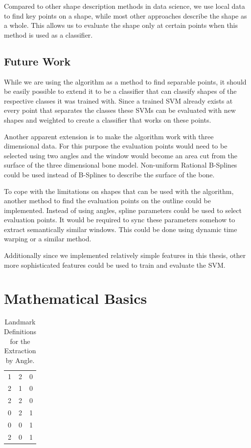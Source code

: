 \documentclass[pdftex,12pt,a4paper]{report}
\begin{document}
Compared to other shape description methods in data science, we use local data to find key points on a shape, while most other approaches describe the shape as a whole. This allows us to evaluate the shape only at certain points when this method is used as a classifier.

\section{Future Work}

While we are using the algorithm as a method to find separable points, it should be easily possible to extend it to be a classifier that can classify shapes of the respective classes it was trained with. Since a trained SVM already exists at every point that separates the classes these SVMs can be evaluated with new shapes and weighted to create a classifier that works on these points.

Another apparent extension is to make the algorithm work with three dimensional data. For this purpose the evaluation points would need to be selected using two angles and the window would become an area cut from the surface of the three dimensional bone model. Non-uniform Rational B-Splines could be used instead of B-Splines to describe the surface of the bone.

To cope with the limitations on shapes that can be used with the algorithm, another method to find the evaluation points on the outline could be implemented. Instead of using angles, spline parameters could be used to select evaluation points. It would be required to sync these parameters somehow to extract semantically similar windows. This could be done using dynamic time warping or a similar method.

Additionally since we implemented relatively simple features in this thesis, other more sophisticated features could be used to train and evaluate the SVM.

\appendix

\chapter{Mathematical Basics}

\begin{table}[h]
	\begin{center}
		\begin{tabular}{|r|r|r|}
			\hline
			\makebox[1cm]{$f_1$} & \makebox[1cm]{$f_2$} & \makebox[1cm]{$c$} \\
			\hline
			\hline 1 & 2 & 0 \\
			\hline 2 & 1 & 0 \\
			\hline 2 & 2 & 0 \\
			\hline 0 & 2 & 1 \\
			\hline 0 & 0 & 1 \\
			\hline 2 & 0 & 1 \\
			\hline
		\end{tabular}
	\end{center}
	\caption{Landmark Definitions for the Extraction by Angle.}
	\label{appendix:table:decision-tree}
\end{table}
\end{document}
